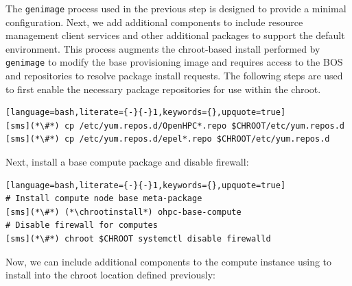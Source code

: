 
The \texttt{genimage} process used in the previous step is designed to provide a minimal \baseOS{} configuration. Next,
we add additional components to include resource management client services and other additional
packages to support the default \OHPC{} environment. This process augments the chroot-based install performed by
\texttt{genimage} to modify the base provisioning image and requires access to the BOS and \OHPC{} repositories to resolve
package install requests. The following steps are used to first enable the necessary package repositories for use within
the chroot.

\begin{lstlisting}[language=bash,literate={-}{-}1,keywords={},upquote=true]
[sms](*\#*) cp /etc/yum.repos.d/OpenHPC*.repo $CHROOT/etc/yum.repos.d
[sms](*\#*) cp /etc/yum.repos.d/epel*.repo $CHROOT/etc/yum.repos.d
\end{lstlisting}

\noindent Next, install a base compute package and disable firewall:
\begin{lstlisting}[language=bash,literate={-}{-}1,keywords={},upquote=true]
# Install compute node base meta-package
[sms](*\#*) (*\chrootinstall*) ohpc-base-compute
# Disable firewall for computes
[sms](*\#*) chroot $CHROOT systemctl disable firewalld
\end{lstlisting}

\noindent Now, we can include additional components to the compute instance using
\texttt{\pkgmgr{}} to install into the chroot location defined previously:
